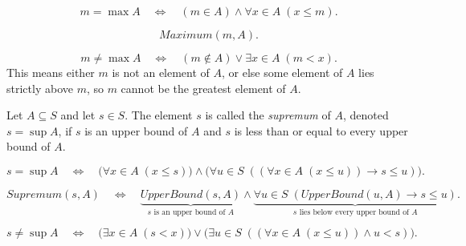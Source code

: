 \begin{remark*}
\[
m = \max A
\quad\Longleftrightarrow\quad
(m \in A) \land \forall x \in A \; (x \le m).
\]
\end{remark*}

\begin{remark*}
\[
Maximum(m,A).
\]
\end{remark*}

\begin{remark*}
\[
m \neq \max A
\quad\Longleftrightarrow\quad
(m \notin A) \lor \exists x \in A \; (m < x).
\]
This means either $m$ is not an element of $A$, or else some element of $A$ lies strictly
above $m$, so $m$ cannot be the greatest element of $A$.
\end{remark*}









\begin{tcolorbox}[colback=propbox, colframe=propborder, arc=2pt,
  left=6pt, right=6pt, top=4pt, bottom=4pt,
  title={\small\textbf{Definition (Supremum)}},
  fonttitle=\small\bfseries]
\begin{definition}
\label{def:supremum}
Let $A \subseteq S$ and let $s \in S$. The element $s$ is called the
\emph{supremum} of $A$, denoted $s = \sup A$, if $s$ is an upper bound of $A$
and $s$ is less than or equal to every upper bound of $A$.
\end{definition}
\end{tcolorbox}

\begin{remark*}
\[
s = \sup A
\quad\Longleftrightarrow\quad
\bigl(\forall x \in A \; (x \le s)\bigr)
\land
\bigl(\forall u \in S \; ((\forall x \in A \; (x \le u)) \rightarrow s \le u)\bigr).
\]
\end{remark*}

\begin{remark*}
\[
Supremum(s,A)
\quad\Longleftrightarrow\quad
\underbrace{UpperBound(s,A)}_{\text{$s$ is an upper bound of $A$}}
\land
\underbrace{\forall u \in S \; (UpperBound(u,A) \rightarrow s \le u)}_{\text{$s$ lies below every upper bound of $A$}}.
\]
\end{remark*}

\begin{remark*}
\[
s \neq \sup A
\quad\Longleftrightarrow\quad
\bigl(\exists x \in A \; (s < x)\bigr)
\lor
\bigl(\exists u \in S \; ((\forall x \in A \; (x \le u)) \land u < s)\bigr).
\]
\end{remark*}

